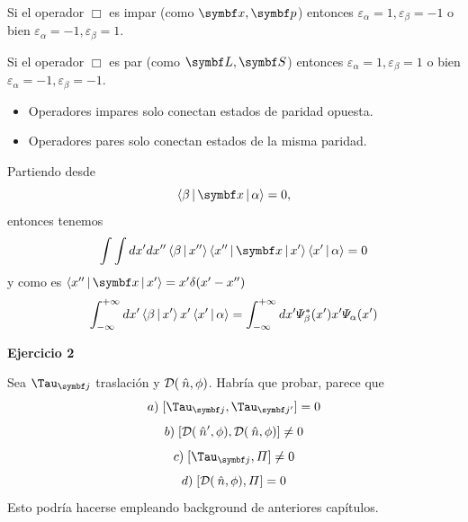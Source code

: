 \documentclass[10pt,oneside]{CBFT_book}
\begin{document}
Si el operador $\Box$ es impar (como $\vb{x}, \vb{p}$) entonces $\varepsilon_\alpha=1,
\varepsilon_\beta=-1$ o bien $\varepsilon_\alpha=-1,\varepsilon_\beta=1$.

Si el operador $\Box$ es par (como $\vb{L}, \vb{S}$) entonces $\varepsilon_\alpha=1,
\varepsilon_\beta=1$ o bien $\varepsilon_\alpha=-1,\varepsilon_\beta=-1$.

\begin{itemize}
 \item Operadores impares solo conectan estados de paridad opuesta.
 \item Operadores pares solo conectan estados de la misma paridad.
\end{itemize}

Partiendo desde 
\[
	\Braket{\beta|\vb{x}|\alpha} = 0, 
\]
entonces tenemos
\[
	\int\int dx'dx''\Braket{\beta|x''}\Braket{x''|\vb{x}|x'}\Braket{x'|\alpha}= 0
\]
y como es $\Braket{x''|\vb{x}|x'} = x' \delta(x' -x'')$
\[
	\int_{-\infty}^{+\infty} dx'\Braket{\beta|x'} x' \Braket{x'|\alpha} =
	\int_{-\infty}^{+\infty} dx'\Psi_\beta^*(x') x' \Psi_\alpha (x')
\]

\begin{ejemplo}{\bf Ejercicio 2}
 
Sea $\Tau_{\vb j}$ traslación y $\mathcal{D}(\:\hat{n},\phi)$. Habría que probar, parece que
\[
	a) \; [ \Tau_{\vb j}, \Tau_{\vb j'}] = 0
\]
\[
	b) \; [ \mathcal{D}(\:\hat{n}',\phi), \mathcal{D}(\:\hat{n},\phi) ] \neq 0
\]
\[
	c) \; [\Tau_{\vb j}, \Pi] \neq 0
\]
\[
	d) \; [\mathcal{D}(\:\hat{n},\phi), \Pi] = 0
\]
Esto podría hacerse empleando background de anteriores capítulos.
 
\end{ejemplo}
\end{document}
